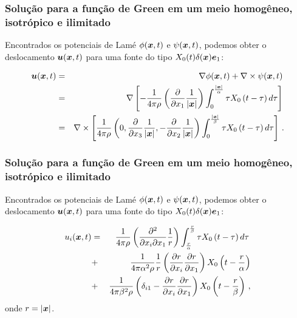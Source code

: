 \documentclass{beamer}
\newcommand{\xvec}{\vc{x}}
\newcommand{\evec}{\vc{e}}
\newcommand{\uvec}{\vc{u}}
\begin{document}
\begin{frame}
	\frametitle{\textbf{Solu\c{c}\~ao para a fun\c{c}\~ao de Green em um meio homog\^eneo, isotr\'opico e ilimitado}}
	
	\begin{flushleft}
		Encontrados os potenciais de Lam\'e $\phi(\xvec,t)$ e $\psi(\xvec,t)$, podemos obter o deslocamento $\uvec(\xvec,t)$ para uma 
		fonte do tipo $X_{0}(t)\delta(\xvec)\evec_1$:
	\end{flushleft}
	\begin{eqnarray}
	\label{ten1}
	\uvec(\xvec,t) &=& \nabla \phi(\xvec,t) + \nabla \times \psi(\xvec,t)\, \\
	&=& \nabla \left[ - \frac{1}{4\pi \rho}  \left( \frac{\partial }{\partial x_1} \frac{1}{\left| \xvec\right|} \right)  \int_{0}^{\frac{\left| \xvec\right|}{\alpha}} \tau X_{0}\left( t -\tau \right)  d\tau  \right] \, \\
	&=& \nabla \times \left[ \frac{1}{4\pi\rho}  \left(0, \frac{\partial }{\partial x_3} \frac{1}{\left| \xvec \right|}, -\frac{\partial }{\partial x_2} \frac{1}{\left| \xvec \right|} \right) \int_{0}^{\frac{\left| \xvec\right|}{\beta}} \tau X_{0}\left( t -\tau \right)  d\tau\right] \, .
	\end{eqnarray}
	
\end{frame}%


\begin{frame}
	\frametitle{\textbf{Solu\c{c}\~ao para a fun\c{c}\~ao de Green em um meio homog\^eneo, isotr\'opico e ilimitado}}
	
	\begin{flushleft}
		Encontrados os potenciais de Lam\'e $\phi(\xvec,t)$ e $\psi(\xvec,t)$, podemos obter o deslocamento $\uvec(\xvec,t)$ para uma 
		fonte do tipo $X_{0}(t)\delta(\xvec)\evec_1$:
	\end{flushleft}
	\begin{eqnarray}
	\label{ten1}
	u_i(\xvec,t) &=& 
	\frac{1}{4\pi \rho}  \left( \frac{\partial^2 }{\partial x_i \partial x_1} \frac{1}{r } \right)  \int_{ \frac{r }{\alpha}}^{ \frac{r}{\beta}} \tau X_{0} \left( t -\tau \right)  d\tau\, \\      
	&+& \frac{1}{4\pi \alpha^2 \rho} \frac{1}{r}  \left(\frac{\partial r}{ \partial x_i} \frac{\partial r}{ \partial x_1}  \right)  X_{0} \left(t - \frac{r}{\alpha} \right) \\
	&+& \frac{1}{4\pi\beta^2 \rho} \left( \delta_{i1}  -  \frac{\partial r}{ \partial x_i} \frac{\partial r}{ \partial x_1}  \right) X_{0} \left(t - \frac{r}{\beta} \right)  \, ,
	\end{eqnarray}
	onde $r = \left| \xvec \right|$.
	
\end{frame}%
\end{document}
